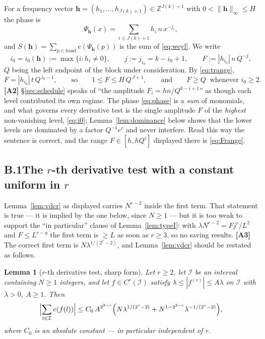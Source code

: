 \documentclass[11pt]{article}
\newtheorem{lemma}[theorem]{Lemma}
\theoremstyle{definition}
\theoremstyle{plain}
\begin{document}
For a frequency vector
$\mathbf h=(h_{1},\dots,h_{J(k)+1})\in\mathbb Z^{J(k)+1}$
with $0<\|\mathbf h\|_{\infty}\le H$ the phase is
\begin{equation}\label{eq:phase}
\Psi_{\mathbf h}(x)=\sum_{i\le J(k)+1}h_{i}\,n\,x^{-j_{i}},
\end{equation}
and $S(\mathbf h)=\sum_{p\in\text{band}}e(\Psi_{\mathbf h}(p))$ is the sum
of \eqref{eq:weyl}.  We write
\begin{equation}\label{eq:i0}
i_{0}=i_{0}(\mathbf h):=\max\{i:h_{i}\ne0\},\qquad
j:=j_{i_{0}}=k-i_{0}+1,\qquad
F:=|h_{i_{0}}|\,n\,Q^{-j},
\end{equation}
$Q$ being the left endpoint of the block under consideration.  By
\eqref{eq:trange},
\begin{equation}\label{eq:Frange}
F=|h_{i_{0}}|\,t\,Q^{\,i_{0}-1},\qquad\text{so}\qquad
1\le F\le H\,Q^{\,J+1},\qquad\text{and}\qquad
F\ge Q\ \text{ whenever }i_{0}\ge2 .
\end{equation}
\textbf{[A2]}  \S\ref{sec:schedule} speaks of ``the amplitude
$F_{i}=hn/Q^{k-i+1}$'' as though each level contributed its own regime.
The phase \eqref{eq:phase} is a \emph{sum} of monomials, and what governs
every derivative test is the single amplitude $F$ of the \emph{highest}
non-vanishing level, \eqref{eq:i0}; Lemma~\ref{lem:dominance} below shows
that the lower levels are dominated by a factor $Q^{-1}e^{r}$ and never
interfere.  Read this way the sentence is correct, and the range
$F\in[h,hQ^{i}]$ displayed there is \eqref{eq:Frange}.

\subsection*{B.1\quad The $r$-th derivative test with a constant uniform in $r$}

Lemma~\ref{lem:vdcr} as displayed carries $N^{r-2}$ inside the first
term.  That statement is true --- it is implied by the one below, since
$N\ge1$ --- but it is too weak to support the ``in particular'' clause of
Lemma~\ref{lem:typeI}: with $\lambda N^{r-2}=Fj^{r}/L^{2}$ and
$F\le L^{r-\eta}$ the first term is $\ge L$ as soon as $r\ge3$, so no
saving results.  \textbf{[A3]}  The correct first term is
$N\lambda^{1/(2^{r}-2)}$, and Lemma~\ref{lem:vdcr} should be restated
as follows.

\begin{lemma}[$r$-th derivative test, sharp form]\label{lem:vdcrB}
Let $r\ge2$, let $\mathcal I$ be an interval containing $N\ge1$ integers,
and let $f\in C^{r}(\mathcal I)$ satisfy
$\lambda\le|f^{(r)}|\le A\lambda$ on $\mathcal I$ with $\lambda>0$,
$A\ge1$.  Then
\[
\Bigl|\sum_{l\in\mathcal I}e(f(l))\Bigr|
\le C_{0}\,A^{2^{2-r}}\Bigl(N\lambda^{1/(2^{r}-2)}
+N^{1-2^{2-r}}\lambda^{-1/(2^{r}-2)}\Bigr),
\]
where $C_{0}$ is an absolute constant --- in particular independent
of $r$.
\end{lemma}
\end{document}
